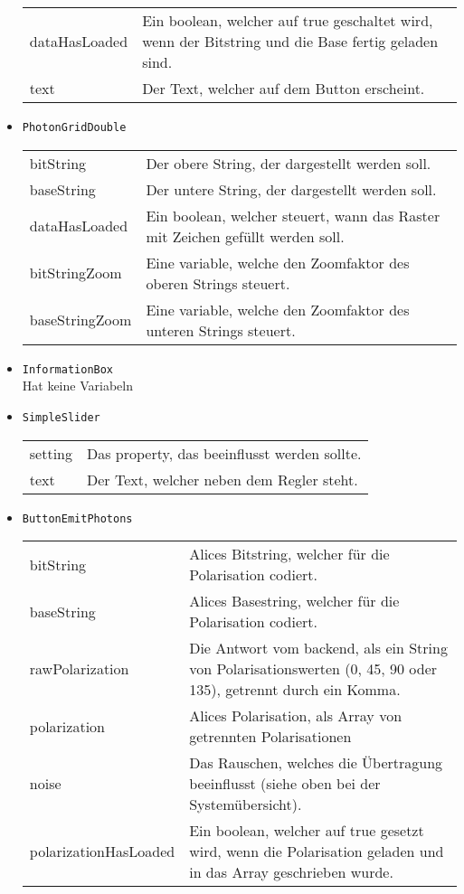 \begin{itemize}
\begin{tabularx}{\textwidth}{p{3cm}p{11cm}}
dataHasLoaded & Ein boolean, welcher auf true geschaltet wird, wenn der Bitstring und die Base fertig geladen sind. \\
text &  Der Text, welcher auf dem Button erscheint. 
\end{tabularx}
\item \texttt{PhotonGridDouble}\\
\begin{tabularx}{\textwidth}{p{3cm}p{11cm}} 
bitString & Der obere String, der dargestellt werden soll. \\
baseString & Der untere String, der dargestellt werden soll. \\
dataHasLoaded & Ein boolean, welcher steuert, wann das Raster mit Zeichen gefüllt werden soll. \\
bitStringZoom & Eine variable, welche den Zoomfaktor des oberen Strings steuert. \\
baseStringZoom & Eine variable, welche den Zoomfaktor des unteren Strings steuert.
\end{tabularx}
\item \texttt{InformationBox} \\
Hat keine Variabeln
\item \texttt{SimpleSlider} \\
\begin{tabularx}{\textwidth}{p{3cm}p{11cm}} 
setting & Das property, das beeinflusst werden sollte. \\
text & Der Text, welcher neben dem Regler steht.
\end{tabularx}
\item \texttt{ButtonEmitPhotons} \\
\begin{tabularx}{\textwidth}{p{3cm}p{11cm}} 
bitString & Alices Bitstring, welcher für die Polarisation codiert. \\
baseString & Alices Basestring, welcher für die Polarisation codiert. \\
rawPolarization & Die Antwort vom backend, als ein String von Polarisationswerten (0, 45, 90 oder 135), getrennt durch ein Komma. \\
polarization & Alices Polarisation, als Array von getrennten Polarisationen \\
noise &  Das Rauschen, welches die Übertragung beeinflusst (siehe oben bei der Systemübersicht). \\
polarizationHasLoaded & Ein boolean, welcher auf true gesetzt wird, wenn die Polarisation geladen und in das Array geschrieben wurde. \\

\end{tabularx}
\end{itemize}
